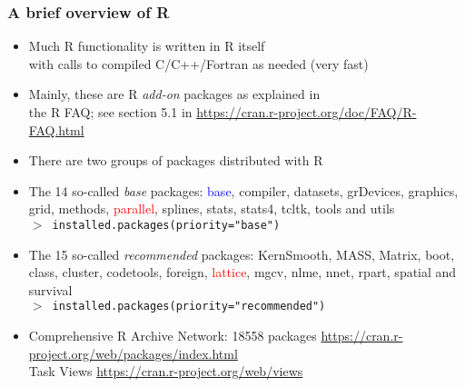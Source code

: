\documentclass[11pt,pdftex,dvipsnames,usenames,helvetica]{beamer}
\begin{document}
\begin{frame} 
\frametitle{A brief overview of R}
\begin{itemize}
\item Much R functionality is written in R itself\\
with calls to compiled C/C++/Fortran as needed (very fast)
\item Mainly, these are R {\it add-on} packages as explained in\\
 the R FAQ;
see section 5.1 in \url{https://cran.r-project.org/doc/FAQ/R-FAQ.html}
\item There are two groups of packages distributed with R
\item The 14 so-called {\it base} packages: \textcolor{blue}{base},
  compiler, datasets, grDevices, graphics, grid, methods,
  \textcolor{red}{parallel}, splines, stats, stats4, tcltk, tools and
  utils\\
{\tt $>$ installed.packages(priority="base")}\\
\item The 15 so-called {\it recommended} packages: KernSmooth, MASS,
  Matrix, boot, class, cluster, codetools, foreign,
  \textcolor{red}{lattice}, mgcv, nlme, nnet, rpart, spatial and
  survival\\
{\tt $>$ installed.packages(priority="recommended")}
\item Comprehensive R Archive Network: 18558 packages
\url{https://cran.r-project.org/web/packages/index.html}\\
Task Views \url{https://cran.r-project.org/web/views}
\end{itemize}
\end{frame}
\end{document}
